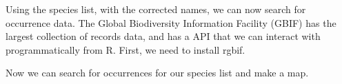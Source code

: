 Using the species list, with the corrected names, we can now search for occurrence data. The Global Biodiversity Information Facility (GBIF) has the largest collection of records data, and has a  API that we can interact with programmatically from R. First, we need to install rgbif.

\begin{knitrout}
\color{fgcolor}\small\begin{kframe}
\begin{alltt}
\hlstd{(}\hlstd{)}
\hlstd{(}\hlstd{,} \hlstd{)}
\end{alltt}
\end{kframe}
\end{knitrout}


Now we can search for occurrences for our species list and make a map.


